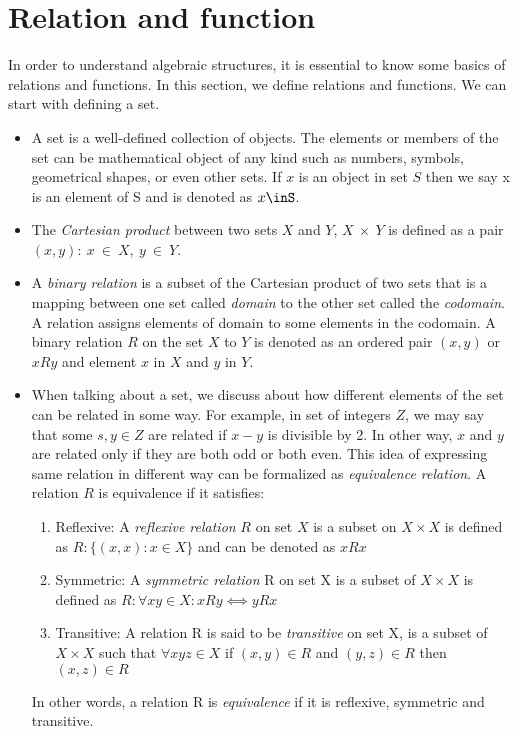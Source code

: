 \section{Relation and function}
In order to understand algebraic structures, it is essential to know some basics
of relations and functions. In this section, we define relations and functions.
We can start with defining a set.
\begin{itemize}
\item 
A set is a well-defined collection of objects. The elements or members of the
set can be mathematical object of any kind such as numbers, symbols, geometrical
shapes, or even other sets. If $x$ is an object in set $S$ then we say x is an
element of S and is denoted as $x\inS$.

\item The \emph{Cartesian product} between two sets $X$ and $Y$,  $X \ \times\
Y$ is defined as a pair ${(x,y) :\ x \ \in\ X,\ y\ \in\ Y }$. 

\item
A \emph{binary relation} is a subset of the Cartesian product of two sets that
is a mapping between one set called \textit{domain} to the other set called the
\textit{codomain}. A relation assigns elements of domain to some elements in
the codomain. A binary relation $R$ on the set $X$ to $Y$ is denoted as an
ordered pair $(x,y)$ or $xRy$ and element $x$ in $X$ and $y$ in $Y$.

\item 
When talking about a set, we discuss about how different elements of the set can
be related in some way. For example, in set of integers $Z$, we may say that
some $s,y \in Z$ are related if $x-y$ is divisible by 2. In other way, $x$ and
$y$ are related only if they are both odd or both even. This idea of expressing
same relation in different way can be formalized as \textit{equivalence
relation}. A relation $R$ is equivalence if it satisfies:
\begin{enumerate}
    \item Reflexive: A \emph{reflexive relation} $R$ on set $X$ is a
subset on \(X \times X\)  is defined as \( R : \{(x,x) : x \in X\}\) and can be
denoted as $xRx$

    \item Symmetric: A \emph{symmetric relation} R on set X is a subset of \(X
\times X\) is defined as \(R: \forall x y \in X: xRy ⟺ yRx\)

    \item Transitive: A relation R is said to be \emph{transitive} on set X, is
a subset of \(X \times X\) such that \(∀ x y z \in X \) if \((x,y) \in R\) and
\((y,z) \in R \) then \((x,z) \in R\)
\end{enumerate}
In other words, a relation R is \emph{equivalence} if it is reflexive, symmetric and transitive.


\end{itemize}
